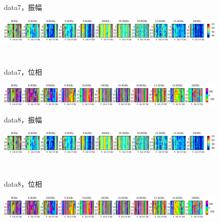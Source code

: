 ﻿\documentclass[12pt,oneside]{jsbook}
\begin{document}
\begin{figure}[hbtp]
 \begin{center}
     \begin{minipage}[c]{0.19\hsize}
      data7，振幅
  \end{minipage}
     \begin{minipage}[c]{0.79\hsize}
\includegraphics[width = \hsize ]{20150204_mine7_raw_a.eps}
  \end{minipage}
\\
     \begin{minipage}[c]{0.19\hsize}
data7，位相
  \end{minipage}
     \begin{minipage}[c]{0.8\hsize}
\includegraphics[width =\hsize ]{20150204_mine7_raw_p.eps}
  \end{minipage}
\end{center}
\end{figure}
\begin{figure}[hbtp]
 \begin{center}
     \begin{minipage}[c]{0.19\hsize}
      data8，振幅
  \end{minipage}
     \begin{minipage}[c]{0.79\hsize}
\includegraphics[width = \hsize ]{20150204_mine8_raw_a.eps}
  \end{minipage}
\\
     \begin{minipage}[c]{0.19\hsize}
data8，位相
  \end{minipage}
     \begin{minipage}[c]{0.8\hsize}
\includegraphics[width =\hsize ]{20150204_mine8_raw_p.eps}
  \end{minipage}
\end{center}
\end{figure}
\end{document}
